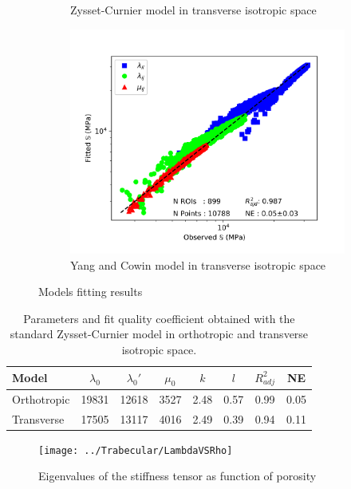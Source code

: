 \documentclass[a4paper,fleqn]{DC_ArtStyle}
\begin{document}
\begin{figure}
\begin{subfigure}[t]{.3\linewidth}
			\caption{Zysset-Curnier model in transverse isotropic space}
		\end{subfigure}
		\begin{subfigure}[t]{.3\linewidth}
			\includegraphics[height=0.8\linewidth]{../Results/SpectralModel}
			\caption{Yang and Cowin model in transverse isotropic space}
		\end{subfigure}
		\caption{Models fitting results}
	\end{figure}
	\begin{table}[!h]
		\centering
		\caption{Parameters and fit quality coefficient obtained with the standard Zysset-Curnier model in orthotropic and transverse isotropic space.}
		\label{TabZysset}
		\begin{tabular}{l|c|c|c|c|c|c|c}
		\toprule
			Model & $\lambda_0$ & $\lambda_0'$ & $\mu_0$ &  $k$ &  $l$ & $R^2_{adj}$ &   NE \\
		\midrule
		Orthotropic &       19831 &        12618 &    3527 & 2.48 & 0.57 &        0.99 & 0.05 \\
		Transverse &       17505 &        13117 &    4016 & 2.49 & 0.39 &        0.94 & 0.11 \\
		\bottomrule
		\end{tabular}
	\end{table}

	\begin{figure}
		\centering
			\texttt{[image: ../Trabecular/LambdaVSRho]}
			\caption{Eigenvalues of the stiffness tensor as function of porosity}
	\end{figure}
\end{document}
